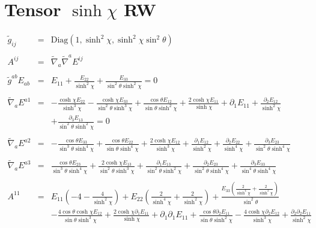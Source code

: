 \documentclass[10pt,letterpaper]{article}
\numberwithin{equation}{section}
\begin{document}
\section{ Tensor $\sinh\chi$ RW }
\begin{eqnarray}
\tilde g_{ij} &=&\text{Diag}\left(1,\sinh^2\chi,\sinh^2\chi\sin^2\theta\right)
\\ \nonumber\\
A^{ij} &=& \tilde\nabla_a\tilde\nabla^a E^{ij}
\\ \nonumber\\
\tilde g^{ab}E_{ab}&=& E_{11} + \frac{E_{22}}{\sinh^2\chi} + \frac{E_{33}}{\sin^2\theta \sinh^2\chi} =0
\\ \nonumber\\
\tilde\nabla_a E^{a 1}&=& - \frac{\cosh\chi E_{22}}{\sinh^3\chi} -  \frac{\cosh\chi E_{33}}{\sin^2\theta \sinh^3\chi} + \frac{\cos\theta E_{12}}{\sin\theta \sinh^2\chi} + \frac{2 \cosh\chi E_{11}}{\sinh\chi} + \partial_{1}E_{11} + \frac{\partial_{2}E_{12}}{\sinh^2\chi} \nonumber \\ 
&& + \frac{\partial_{3}E_{13}}{\sin^2\theta \sinh^2\chi}=0
\\ \nonumber\\
\tilde\nabla_a E^{a 2}&=& - \frac{\cos\theta E_{33}}{\sin^3\theta \sinh^4\chi} + \frac{\cos\theta E_{22}}{\sin\theta \sinh^4\chi} + \frac{2 \cosh\chi E_{12}}{\sinh^3\chi} + \frac{\partial_{1}E_{12}}{\sinh^2\chi} + \frac{\partial_{2}E_{22}}{\sinh^4\chi} + \frac{\partial_{3}E_{23}}{\sin^2\theta \sinh^4\chi}
\\ \nonumber\\
\tilde\nabla_a E^{a 3}&=& \frac{\cos\theta E_{23}}{\sin^3\theta \sinh^4\chi} + \frac{2 \cosh\chi E_{13}}{\sin^2\theta \sinh^3\chi} + \frac{\partial_{1}E_{13}}{\sin^2\theta \sinh^2\chi} + \frac{\partial_{2}E_{23}}{\sin^2\theta \sinh^4\chi} + \frac{\partial_{3}E_{33}}{\sin^4\theta \sinh^4\chi}
\\ \nonumber\\
A^{11}&=& E_{11} \left(-4 -  \frac{4}{\sinh^2\chi}\right) + E_{22} \left(\frac{2}{\sinh^4\chi} + \frac{2}{\sinh^2\chi}\right) + \frac{E_{33} \left(\frac{2}{\sinh^4\chi} + \frac{2}{\sinh^2\chi}\right)}{\sin^2\theta} \nonumber \\ 
&& -  \frac{4 \cos\theta \cosh\chi E_{12}}{\sin\theta \sinh^3\chi} + \frac{2 \cosh\chi \partial_{1}E_{11}}{\sinh\chi} + \partial_{1}\partial_{1}E_{11} + \frac{\cos\theta \partial_{2}E_{11}}{\sin\theta \sinh^2\chi} -  \frac{4 \cosh\chi \partial_{2}E_{12}}{\sinh^3\chi} + \frac{\partial_{2}\partial_{2}E_{11}}{\sinh^2\chi} \nonumber \\ 

\end{eqnarray}
\end{document}
